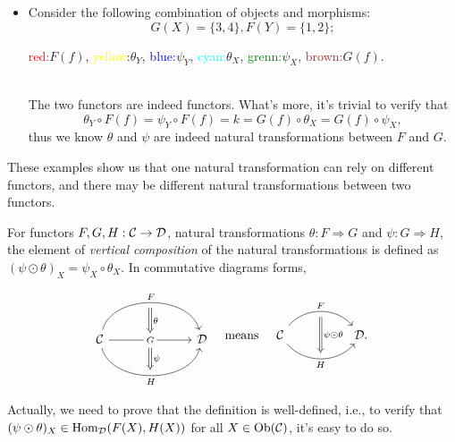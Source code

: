 \documentclass{article}
\begin{document}
\begin{exm}
\begin{itemize}
		\item Consider the following combination of objects and morphisms:
			\[G(X)=\{3,4\},F(Y)=\{1,2\};\]
			\centerline{\textcolor{red}{red:}$F(f)$, \textcolor{yellow}{yellow}:$\theta_Y$, \textcolor{blue}{blue:}$\psi_Y$, \textcolor{cyan}{cyan:}$\theta_X$, \textcolor{green}{grenn:}$\psi_X$, \textcolor{brown}{brown:}$G(f)$.}\\
		The two functors are indeed functors. What's more, it's trivial to verify that
		\[\theta_Y\circ F(f)=\psi_Y\circ F(f)=k=G(f)\circ\theta_X=G(f)\circ\psi_X,\]
		thus we know $\theta$ and $\psi$ are indeed natural transformations between $F$ and $G$.
	\end{itemize}
	These examples show us that one natural transformation can rely on different functors, and there may be different natural transformations between two functors. 
\end{exm}


\begin{defi}\label{vertical composition}
	For functors $F,G,H:\mathcal{C}\to\mathcal{D}$, natural transformations $\theta:F\Rightarrow G$ and $\psi:G\Rightarrow H$, the element of \emph{vertical composition} of the natural transformations is defined as $(\psi\odot\theta)_X=\psi_X\circ\theta_X$. In commutative diagrams forms,
	
	\[\begin{tikzcd}
			& \arrow[d,Rightarrow,"\theta"] & \\
			\C \arrow[rr, "F", bend left=75] \arrow[rr, "H"', bend right=75] \arrow[rr, "G" description] &
			\textcolor{white}{s} \arrow[d,Rightarrow,"\psi"] &
			\D\\ & \quad &
		\end{tikzcd}\quad\text{means}\quad\begin{tikzcd}
			\C
			\arrow[bend left=50, rr, "F", ""' name=F]
			\arrow[bend right=50, rr, "H"', "" name=H] & & 
			\arrow[Rightarrow, from=F, to=H, "\psi\odot\theta"] \D.
	\end{tikzcd}\]
	
	Actually, we need to prove that the definition is well-defined, i.e., to verify that $(\psi\odot\theta)_X\in\mathrm{Hom}_{\mathcal{D}}(F(X),H(X))$ for all $X\in\mathrm{Ob}(\mathcal{C})$, it's easy to do so.
\end{defi}
\end{document}
